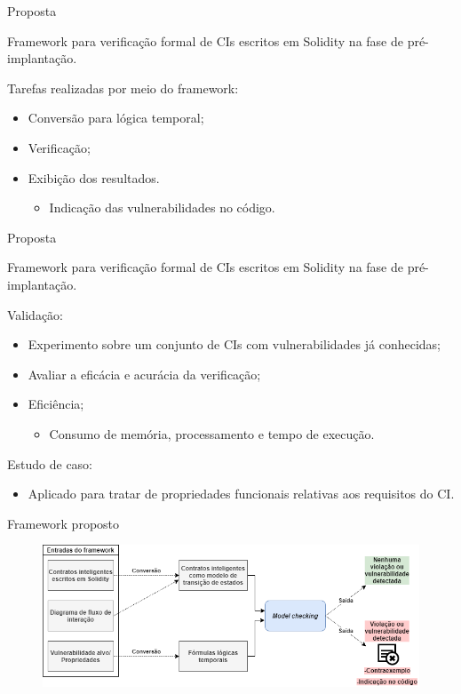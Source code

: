 \begin{frame}{Proposta}
    \begin{block}{}
    Framework para verificação formal de CIs escritos em Solidity na fase de pré-implantação.
    \end{block}
    Tarefas realizadas por meio do framework:
    \begin{itemize}
        \item Conversão para lógica temporal;
        \item Verificação;
        \item Exibição dos resultados.
        \begin{itemize}
            \item Indicação das vulnerabilidades no código.
        \end{itemize}
    \end{itemize}
\end{frame}

\begin{frame}{Proposta}
    \begin{block}{}
    Framework para verificação formal de CIs escritos em Solidity na fase de pré-implantação.
    \end{block}
    Validação: 
    \begin{itemize}
        \item Experimento sobre um conjunto de CIs com vulnerabilidades já conhecidas;
        \item Avaliar a eficácia e acurácia da verificação;
        \item Eficiência;
        \begin{itemize}
            \item Consumo de memória, processamento e tempo de execução.
        \end{itemize}
    \end{itemize}
    Estudo de caso:
    \begin{itemize}
        \item Aplicado para tratar de propriedades funcionais relativas aos requisitos do CI.
    \end{itemize}    
\end{frame}

\begin{frame}{Framework proposto}
    \begin{figure}[!htb]
     \centering
     \includegraphics[scale=0.4]{figuras/proposta/framework.png}
    \end{figure}    
\end{frame}

